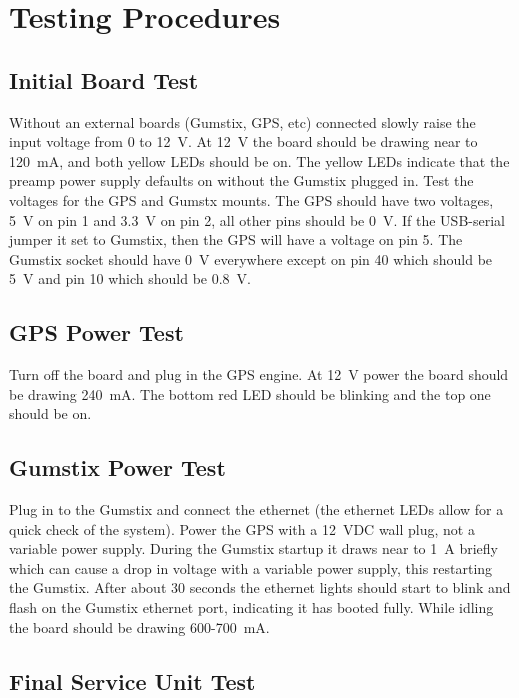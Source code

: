 \section{Testing Procedures}

\subsection{Initial Board Test}
\label{su:subsection:suTest1}

Without an external boards (Gumstix, GPS, etc) connected slowly raise the input voltage from 0 to 12~V. 
At 12~V the board should be drawing near to 120~mA, and both yellow LEDs should be on.
The yellow LEDs indicate that the preamp power supply defaults on without the Gumstix plugged in.
Test the voltages for the GPS and Gumstx mounts.
The GPS should have two voltages, 5~V on pin 1 and 3.3~V on pin 2, all other pins should be 0~V.
If the USB-serial jumper it set to Gumstix, then the GPS will have a voltage on pin 5.
The Gumstix socket should have 0~V everywhere except on pin 40 which should be 5~V and pin 10 which should be 0.8~V.

\subsection{GPS Power Test}
\label{su:subsection:suTest2}

Turn off the board and plug in the GPS engine.
At 12~V power the board should be drawing 240~mA.
The bottom red LED should be blinking and the top one should be on.

\subsection{Gumstix Power Test}
\label{su:subsection:suTest3}

Plug in to the Gumstix and connect the ethernet (the ethernet LEDs allow for a quick check of the system).
Power the GPS with a 12~VDC wall plug, not a variable power supply.
During the Gumstix startup it draws near to 1~A briefly which can cause a drop in voltage with a variable power supply, this restarting the Gumstix.
After about 30 seconds the ethernet lights should start to blink and flash on the Gumstix ethernet port, indicating it has booted fully.
While idling the board should be drawing 600-700~mA.

\subsection{Final Service Unit Test}
\label{su:subsection:suTest4}

